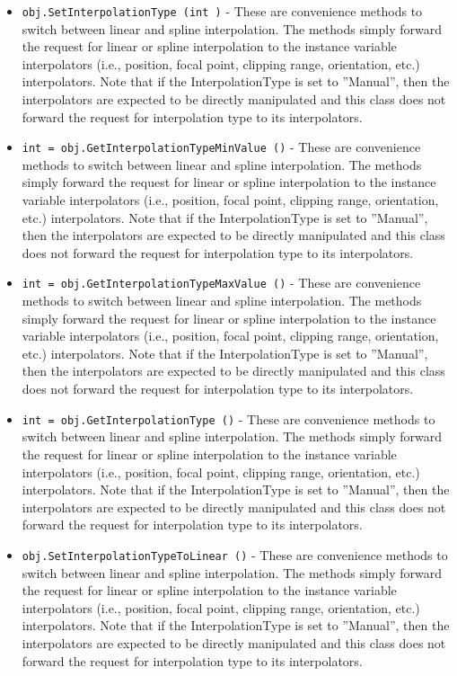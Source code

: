 \begin{itemize}
\item  \verb|obj.SetInterpolationType (int )| -  These are convenience methods to switch between linear and spline
 interpolation. The methods simply forward the request for linear or
 spline interpolation to the instance variable interpolators (i.e.,
 position, focal point, clipping range, orientation, etc.)
 interpolators. Note that if the InterpolationType is set to ''Manual'',
 then the interpolators are expected to be directly manipulated and this
 class does not forward the request for interpolation type to its
 interpolators.

\item  \verb|int = obj.GetInterpolationTypeMinValue ()| -  These are convenience methods to switch between linear and spline
 interpolation. The methods simply forward the request for linear or
 spline interpolation to the instance variable interpolators (i.e.,
 position, focal point, clipping range, orientation, etc.)
 interpolators. Note that if the InterpolationType is set to ''Manual'',
 then the interpolators are expected to be directly manipulated and this
 class does not forward the request for interpolation type to its
 interpolators.

\item  \verb|int = obj.GetInterpolationTypeMaxValue ()| -  These are convenience methods to switch between linear and spline
 interpolation. The methods simply forward the request for linear or
 spline interpolation to the instance variable interpolators (i.e.,
 position, focal point, clipping range, orientation, etc.)
 interpolators. Note that if the InterpolationType is set to ''Manual'',
 then the interpolators are expected to be directly manipulated and this
 class does not forward the request for interpolation type to its
 interpolators.

\item  \verb|int = obj.GetInterpolationType ()| -  These are convenience methods to switch between linear and spline
 interpolation. The methods simply forward the request for linear or
 spline interpolation to the instance variable interpolators (i.e.,
 position, focal point, clipping range, orientation, etc.)
 interpolators. Note that if the InterpolationType is set to ''Manual'',
 then the interpolators are expected to be directly manipulated and this
 class does not forward the request for interpolation type to its
 interpolators.

\item  \verb|obj.SetInterpolationTypeToLinear ()| -  These are convenience methods to switch between linear and spline
 interpolation. The methods simply forward the request for linear or
 spline interpolation to the instance variable interpolators (i.e.,
 position, focal point, clipping range, orientation, etc.)
 interpolators. Note that if the InterpolationType is set to ''Manual'',
 then the interpolators are expected to be directly manipulated and this
 class does not forward the request for interpolation type to its
 interpolators.


\end{itemize}
